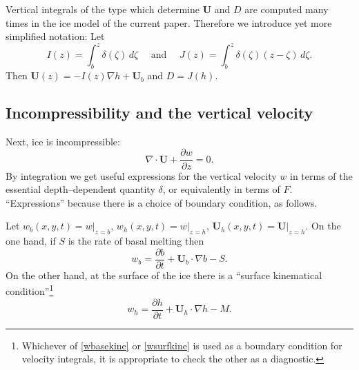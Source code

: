 \documentclass{amsart}%
\theoremstyle{plain}
\theoremstyle{definition}
\theoremstyle{remark}
\newcommand{\ddt}[1]{\ensuremath{\frac{\partial #1}{\partial t}}}
\newcommand{\ddz}[1]{\ensuremath{\frac{\partial #1}{\partial z}}}
\newcommand{\diverg}{\nabla\cdot}
\newcommand{\grad}{\nabla}
\newcommand{\bU}{{\mathbf{U}}}
\begin{document}
Vertical integrals of the type which determine $\bU$ and $D$ are computed many times in the ice model of the current paper.  Therefore we introduce yet more simplified notation:  Let
    $$I(z)=\int_b^z \delta(\zeta)\,d\zeta \quad \text{ and } \quad J(z)=\int_b^z \delta(\zeta)(z-\zeta)\,d\zeta.$$
Then $\bU(z)=-I(z)\grad h + \bU_b$ and $D=J(h)$.


\subsection{Incompressibility and the vertical velocity}\label{incompsubsect}  Next, ice is incompressible:
    $$\diverg \bU + \ddz{w}=0.$$
By integration we get useful expressions for the vertical velocity $w$ in terms of the essential depth--dependent quantity $\delta$, or equivalently in terms of $F$.  ``Expression\emph{s}'' because there is a choice of boundary condition, as follows.

Let $w_b(x,y,t)=w\big|_{z=b}$, $w_h(x,y,t)=w\big|_{z=h}$, $\bU_h(x,y,t)=\bU\big|_{z=h}$.  On the one hand, if $S$ is the rate of basal melting then \cite{PayneDongelmans}
\begin{equation}\label{wbasekine}
w_b=\ddt{b}+ \bU_b\cdot\grad b - S.
\end{equation}
On the other hand, at the surface of the ice there is a ``surface kinematical condition''\footnote{Whichever of \eqref{wbasekine} or \eqref{wsurfkine} is used as a boundary condition for velocity integrals, it is appropriate to check the other as a diagnostic.}
\begin{equation}\label{wsurfkine}
w_h=\ddt{h}+ \bU_h\cdot\grad h - M.
\end{equation}
\end{document}
